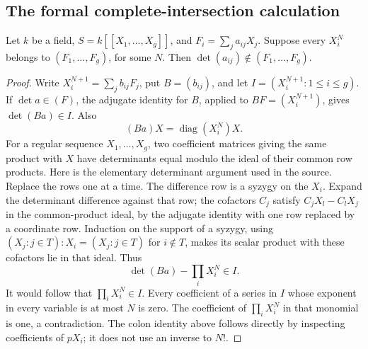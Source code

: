 \subsection{The formal complete-intersection calculation}
\begin{srlemma}
\label{lem:ftb-socle-determinant}
Let \(k\) be a field, \(S=k[[X_1,\ldots,X_g]]\), and
\(F_i=\sum_j a_{ij}X_j\).  Suppose every \(X_i^N\) belongs to
\((F_1,\ldots,F_g)\), for some \(N\).
Then \(\det(a_{ij})\notin(F_1,\ldots,F_g)\).
\end{srlemma}
\begin{proof}
Write \(X_i^{N+1}=\sum_jb_{ij}F_j\), put \(B=(b_{ij})\),
and let \(I=(X_i^{N+1}:1\leq i\leq g)\).
If \(\det a\in(F)\), the adjugate identity for \(B\), applied to
\(BF=(X_i^{N+1})\), gives \(\det(Ba)\in I\).
Also
\[
 (Ba)X=\operatorname{diag}(X_i^N)X .
\]
For a regular sequence \(X_1,\ldots,X_g\), two coefficient matrices
giving the same product with \(X\) have determinants equal modulo
the ideal of their common row products.  Here is the elementary
determinant argument used in the source.  Replace the rows one at
a time.  The difference row is a syzygy on the \(X_i\).
Expand the determinant difference against that row; the cofactors
\(C_j\) satisfy \(C_jX_l-C_lX_j\) in the common-product ideal,
by the adjugate identity with one row replaced by a coordinate row.
Induction on the support of a syzygy, using
\((X_j:j\in T):X_i=(X_j:j\in T)\) for \(i\notin T\), makes
its scalar product with these cofactors lie in that ideal.
Thus
\[
 \det(Ba)-\prod_iX_i^N\in I .
\]
It would follow that \(\prod_iX_i^N\in I\).
Every coefficient of a series in \(I\) whose exponent in every
variable is at most \(N\) is zero.  The coefficient of
\(\prod_iX_i^N\) in that monomial is one, a contradiction.
The colon identity above follows directly by inspecting coefficients
of \(pX_i\); it does not use an inverse to \(N!\).
\end{proof}

